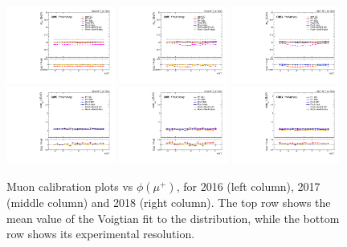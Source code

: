 \begin{figure}[!htb]
      \centering
      \includegraphics[width=0.32\textwidth]{pics/muon_corr/muon_cal/2016/muP_phi_summary_mean.pdf}
      \includegraphics[width=0.32\textwidth]{pics/muon_corr/muon_cal/2017/muP_phi_summary_mean.pdf}
      \includegraphics[width=0.32\textwidth]{pics/muon_corr/muon_cal/2018/muP_phi_summary_mean.pdf}
      \includegraphics[width=0.32\textwidth]{pics/muon_corr/muon_cal/2016/muP_phi_summary_reso.pdf}
      \includegraphics[width=0.32\textwidth]{pics/muon_corr/muon_cal/2017/muP_phi_summary_reso.pdf}
      \includegraphics[width=0.32\textwidth]{pics/muon_corr/muon_cal/2018/muP_phi_summary_reso.pdf}
      \caption{Muon calibration plots vs $\phi(\mu^{+})$, for 2016 (left column), 2017 (middle column) and 2018 (right column).
              The top row shows the mean value of the Voigtian fit to the \mmm distribution, 
              while the bottom row shows its experimental resolution.}
      \label{fig:mucal_muP_phi}
\end{figure}


